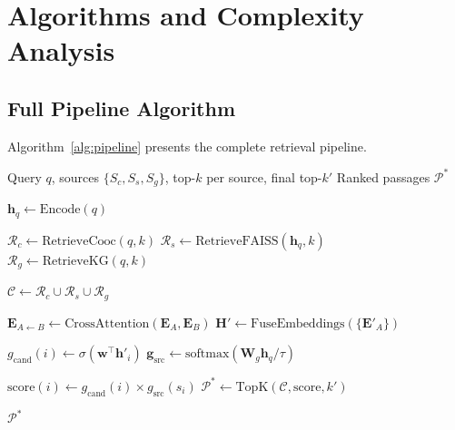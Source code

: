 \documentclass[10pt,twocolumn]{article}
\begin{document}
\section{Algorithms and Complexity Analysis}
\label{sec:algorithms}

\subsection{Full Pipeline Algorithm}

Algorithm~\ref{alg:pipeline} presents the complete retrieval pipeline.

\begin{algorithm}[t]
\caption{Triple-Source RAG Pipeline}
\label{alg:pipeline}
\begin{algorithmic}[1]
\REQUIRE Query $q$, sources $\{S_c, S_s, S_g\}$, top-$k$ per source, final top-$k'$
\ENSURE Ranked passages $\mathcal{P}^*$

\STATE $\mathbf{h}_q \leftarrow \text{Encode}(q)$ 

\STATE {}
\STATE $\mathcal{R}_c \leftarrow \text{RetrieveCooc}(q, k)$ 
\STATE $\mathcal{R}_s \leftarrow \text{RetrieveFAISS}(\mathbf{h}_q, k)$ 
\STATE $\mathcal{R}_g \leftarrow \text{RetrieveKG}(q, k)$ 

\STATE $\mathcal{C} \leftarrow \mathcal{R}_c \cup \mathcal{R}_s \cup \mathcal{R}_g$ 

\STATE {}
    \STATE $\mathbf{E}_{A \leftarrow B} \leftarrow \text{CrossAttention}(\mathbf{E}_A, \mathbf{E}_B)$
\ENDFOR
\STATE $\mathbf{H}' \leftarrow \text{FuseEmbeddings}(\{\mathbf{E}'_A\})$ 

\STATE {}
    \STATE $g_{\text{cand}}(i) \leftarrow \sigma(\mathbf{w}^\top \mathbf{h}'_i)$ 
\ENDFOR
\STATE $\mathbf{g}_{\text{src}} \leftarrow \text{softmax}(\mathbf{W}_g \mathbf{h}_q / \tau)$ 

\STATE {}
    \STATE $\text{score}(i) \leftarrow g_{\text{cand}}(i) \times g_{\text{src}}(s_i)$
\ENDFOR
\STATE $\mathcal{P}^* \leftarrow \text{TopK}(\mathcal{C}, \text{score}, k')$ 

\RETURN $\mathcal{P}^*$
\end{algorithmic}
\end{algorithm}
\end{document}
